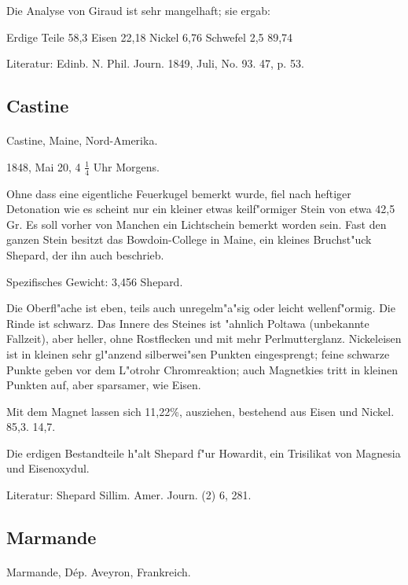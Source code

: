\documentclass[a4paper, 11pt, oneside]{article}
\begin{document}
Die Analyse von Giraud ist sehr mangelhaft; sie ergab:

Erdige Teile 58,3  
Eisen 22,18  
Nickel 6,76  
Schwefel 2,5  
89,74

\footnotesize
Literatur: Edinb. N. Phil. Journ. 1849, Juli, No. 93. 47, p. 53.

\subsection{Castine}
\normalsize
\paragraph{}
Castine, Maine, Nord-Amerika.

1848, Mai 20, 4 $\frac{1}{4}$ Uhr Morgens.

Ohne dass eine eigentliche Feuerkugel bemerkt wurde, fiel nach heftiger Detonation wie es scheint nur ein kleiner etwas keilf"ormiger Stein von etwa 42,5 Gr. Es soll vorher von Manchen ein Lichtschein bemerkt worden sein. Fast den ganzen Stein besitzt das Bowdoin-College in Maine, ein kleines Bruchst"uck Shepard, der ihn auch beschrieb.

Spezifisches Gewicht: 3,456 Shepard.

Die Oberfl"ache ist eben, teils auch unregelm"a"sig oder leicht wellenf"ormig. Die Rinde ist schwarz. Das Innere des Steines ist "ahnlich Poltawa (unbekannte Fallzeit), aber heller, ohne Rostflecken und mit mehr Perlmutterglanz. Nickeleisen ist in kleinen sehr gl"anzend silberwei"sen Punkten eingesprengt; feine schwarze Punkte geben vor dem L"otrohr Chromreaktion; auch Magnetkies tritt in kleinen Punkten auf, aber sparsamer, wie Eisen.

Mit dem Magnet lassen sich 11,22\%, ausziehen, bestehend aus  
Eisen und Nickel.  
85,3. 14,7.

Die erdigen Bestandteile h"alt Shepard f"ur Howardit, ein Trisilikat von Magnesia und Eisenoxydul.

\footnotesize
Literatur: Shepard Sillim. Amer. Journ. (2) 6, 281.

\subsection{Marmande}
\normalsize
\paragraph{}
Marmande, Dép. Aveyron, Frankreich.
\end{document}
